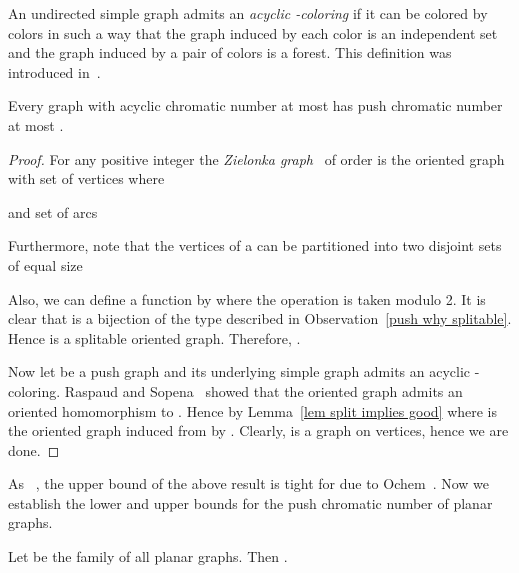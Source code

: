 \documentclass[10pt]{article}
\begin{document}
\medskip

An undirected simple  graph  admits an \textit{acyclic -coloring} if it can be colored by  colors 
in such a way that the graph induced by each color is an independent set and the graph induced by a pair of colors is a forest. 
This definition was introduced in~\cite{acyclic-def}.

\begin{theorem}\label{pushacyclic}
Every graph with acyclic chromatic number at most  has push chromatic number at most . 
\end{theorem}


\begin{proof}
For any positive integer  the \textit{Zielonka graph}~\cite{orientedchi}   of order  is  the oriented graph with    set of vertices   where 




\noindent and  set of arcs  


 
\medskip 
 
Furthermore, note that the vertices of a   can be partitioned into two disjoint sets of equal size





Also, we can define a function  by  where the  operation is taken modulo 2. It is clear that  is a bijection of the type described in Observation~\ref{push why splitable}. 
Hence  is 
a splitable oriented graph. 
Therefore, . 


Now let  be a push graph and its underlying simple graph  admits an acyclic -coloring. 
Raspaud and Sopena~\cite{planar80} showed that the oriented graph  admits an oriented homomorphism to . 
Hence by Lemma~\ref{lem split implies good}  where  
is the oriented graph induced from  by . 
Clearly,  is a graph on 
 vertices, hence we are done. 
\end{proof}

As 
~\cite{push}, 
the upper bound of the above result is tight for  due to Ochem~\cite{Ochem_negativeresults}.
Now we establish the lower and upper bounds for the push chromatic number of  planar graphs.



\begin{theorem}\label{th p3}
Let  be the family of all planar graphs. Then . 
\end{theorem}
\end{document}
